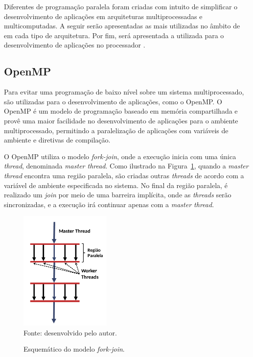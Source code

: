 Diferentes \apis de programação paralela foram criadas com intuito de simplificar
o desenvolvimento de aplicações em arquiteturas multiprocessadas e multicomputadas.
A seguir serão apresentadas as \apis mais utilizadas no âmbito de \hpc em cada tipo de
arquitetura. Por fim, será apresentada a \api utilizada para o desenvolvimento de aplicações
no processador \mppa.


\subsection{OpenMP}

%


Para evitar uma programação de baixo nível sobre um sistema multiprocessado, são
utilizadas \apis para o desenvolvimento de aplicações, como o OpenMP. O OpenMP
é um modelo de programação baseado em memória compartilhada e provê uma maior
facilidade no desenvolvimento de aplicações para o ambiente multiprocessado,
permitindo a paralelização de aplicações com variáveis de ambiente e
diretivas de compilação.

O OpenMP utiliza o modelo \textit{fork-join}, onde a execução inicia com uma
única \textit{thread}, denominada \textit{master thread}. Como ilustrado na
Figura~\ref{fig:forkjoin}, quando a \textit{master thread} encontra
uma região paralela, são criadas outras \textit{threads} de acordo com a variável
de ambiente especificada no sistema. No final da região paralela, é realizado um
\textit{join} por meio de uma barreira implícita, onde as \textit{threads} serão
sincronizadas, e a execução irá continuar apenas com a \textit{master thread}.

\begin{figure}[t]
	\centering
	\caption{Esquemático do modelo \textit{fork-join}.}
	\includegraphics[width=0.4\textwidth]{figs/forkjoin.pdf} \\
    Fonte: desenvolvido pelo autor.
	\label{fig:forkjoin}
\end{figure}

